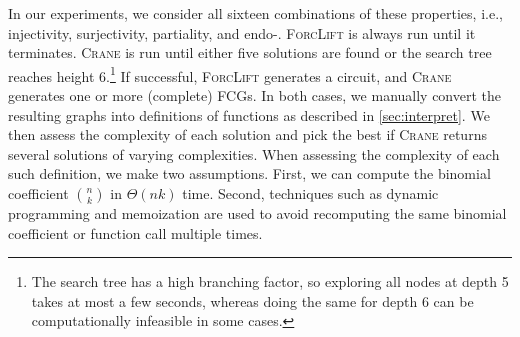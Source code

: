 In our experiments, we consider all sixteen combinations of these properties,
i.e., injectivity, surjectivity, partiality, and endo-. \textsc{ForcLift} is
always run until it terminates. \textsc{Crane} is run until either five
solutions are found or the search tree reaches height 6.\footnote{The search
  tree has a high branching factor, so exploring all nodes at depth 5 takes at
  most a few seconds, whereas doing the same for depth 6 can be computationally
  infeasible in some cases.} If successful, \textsc{ForcLift} generates a
circuit, and \textsc{Crane} generates one or more (complete) FCGs. In both
cases, we manually convert the resulting graphs into definitions of functions as
described in \cref{sec:interpret}. We then assess the complexity of each
solution and pick the best if \textsc{Crane} returns several solutions of
varying complexities. When assessing the complexity of each such definition, we
make two assumptions. First, we can compute the binomial coefficient
$\binom{n}{k}$ in $\Theta(nk)$ time. Second, techniques such as dynamic
programming and memoization are used to avoid recomputing the same binomial
coefficient or function call multiple times.

